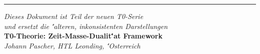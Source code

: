 \documentclass[12pt,a4paper]{article}
\begin{document}
	\begin{center}
		\hrule
		\vspace{0.5cm}
		\textit{Dieses Dokument ist Teil der neuen T0-Serie}\\
		\textit{und ersetzt die \''alteren, inkonsistenten Darstellungen}\\
		\vspace{0.3cm}
		\textbf{T0-Theorie: Zeit-Masse-Dualit\''at Framework}\\
		\textit{Johann Pascher, HTL Leonding, {\''O}sterreich}\\
	\end{center}
	
\end{document}
